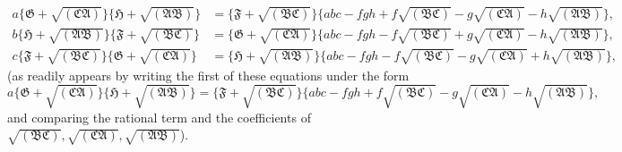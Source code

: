 \documentclass[11pt]{article}
\begin{document}
\[
\begin{aligned}
a\{\mathfrak{G} + \sqrt{(\mathfrak{CA})}\}\{\mathfrak{H} + \sqrt{(\mathfrak{AB})}\} &= \{\mathfrak{F} + \sqrt{(\mathfrak{BC})}\}\{abc - fgh + f\sqrt{(\mathfrak{BC})} - g\sqrt{(\mathfrak{CA})} - h\sqrt{(\mathfrak{AB})}\},\\
b\{\mathfrak{H} + \sqrt{(\mathfrak{AB})}\}\{\mathfrak{F} + \sqrt{(\mathfrak{BC})}\} &= \{\mathfrak{G} + \sqrt{(\mathfrak{CA})}\}\{abc - fgh - f\sqrt{(\mathfrak{BC})} + g\sqrt{(\mathfrak{CA})} - h\sqrt{(\mathfrak{AB})}\},\\
c\{\mathfrak{F} + \sqrt{(\mathfrak{BC})}\}\{\mathfrak{G} + \sqrt{(\mathfrak{CA})}\} &= \{\mathfrak{H} + \sqrt{(\mathfrak{AB})}\}\{abc - fgh - f\sqrt{(\mathfrak{BC})} - g\sqrt{(\mathfrak{CA})} + h\sqrt{(\mathfrak{AB})}\},
\end{aligned}
\]
(as readily appears by writing the first of these equations under the form
\[ a\{\mathfrak{G} + \sqrt{(\mathfrak{CA})}\}\{\mathfrak{H} + \sqrt{(\mathfrak{AB})}\} = \{\mathfrak{F} + \sqrt{(\mathfrak{BC})}\}\{abc - fgh + f\sqrt{(\mathfrak{BC})} - g\sqrt{(\mathfrak{CA})} - h\sqrt{(\mathfrak{AB})}\}, \]
and comparing the rational term and the coefficients of $\sqrt{(\mathfrak{BC})}, \sqrt{(\mathfrak{CA})}, \sqrt{(\mathfrak{AB})}$).
\end{document}
